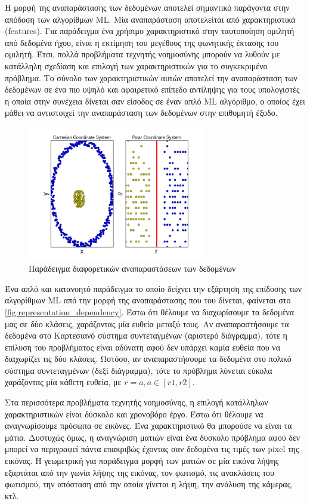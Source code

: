 Η μορφή της αναπαράστασης των δεδομένων αποτελεί σημαντικό παράγοντα στην
απόδοση των αλγορίθμων ML. Μία αναπαράσταση αποτελείται από χαρακτηριστικά (features).
Για παράδειγμα ένα χρήσιμο χαρακτηριστικό στην ταυτοποίηση ομιλητή από δεδομένα ήχου,
είναι η εκτίμηση του μεγέθους της φωνητικής έκτασης του ομιλητή.
Έτσι, πολλά προβλήματα τεχνητής νοημοσύνης μπορούν να λυθούν
με κατάλληλη σχεδίαση και επιλογή των χαρακτηριστικών για το συγκεκριμένο
πρόβλημα. Το σύνολο των χαρακτηριστικών αυτών αποτελεί την αναπαράσταση των δεδομένων
σε ένα πιο υψηλό και αφαιρετικό επίπεδο αντίληψης για τους υπολογιστές η οποία
στην συνέχεια δίνεται σαν είσοδος σε έναν απλό ML αλγόριθμο, ο οποίος έχει
μάθει να αντιστοιχεί την αναπαράσταση των δεδομένων στην επιθυμητή έξοδο.
\begin{figure}[!h]
  \centering
  \includegraphics[width=0.7\textwidth]{./images/chapter3/representation_dependency.png}
  \caption[Παράδειγμα διαφορετικών αναπαραστάσεων των δεδομένων]{Παράδειγμα διαφορετικών αναπαραστάσεων των δεδομένων}
  \label{fig:representation_dependency}
\end{figure}

Ένα απλό και κατανοητό παράδειγμα το οποίο δείχνει την εξάρτηση της επίδοσης των
αλγορίθμων ML από την μορφή της αναπαράστασης που του δίνεται, φαίνεται στο
\autoref{fig:representation_dependency}. Έστω ότι θέλουμε να
διαχωρίσουμε τα δεδομένα μας σε δύο κλάσεις, χαράζοντας μία ευθεία
μεταξύ τους. Αν αναπαραστήσουμε τα δεδομένα στο Καρτεσιανό σύστημα συντεταγμένων (αριστερό διάγραμμα),
τότε η επίλυση του προβλήματος είναι αδύνατη αφού δεν υπάρχει καμία ευθεία
που να διαχωρίζει τις δύο κλάσεις. Ωστόσο, αν αναπαραστήσουμε τα δεδομένα
στο πολικό σύστημα συντεταγμένων (δεξί διάγραμμα), τότε το πρόβλημα λύνεται
εύκολα χαράζοντας μία κάθετη ευθεία, με $r  = a, a \in [r1, r2]$.

Στα περισσότερα προβλήματα τεχνητής νοημοσύνης, η επιλογή κατάλληλων χαρακτηριστικών
είναι δύσκολο και χρονοβόρο έργο. Έστω ότι θέλουμε να αναγνωρίσουμε
πρόσωπα σε εικόνες. Ένα χαρακτηριστικό θα μπορούσε να είναι τα μάτια. Δυστυχώς όμως,
η αναγνώριση ματιών είναι ένα δύσκολο πρόβλημα αφού δεν μπορεί να
περιγραφεί πάντα επακριβώς έχοντας σαν δεδομένα τις τιμές των pixel της εικόνας.
Η γεωμετρική για παράδειγμα μορφή των ματιών σε μία εικόνα λήψης εξαρτάται από την
γωνία λήψης της εικόνας, τον φωτισμό, τις ανακλάσεις του φωτισμού,
την απόσταση από την οποία γίνεται η λήψη, την ανάλυση της κάμερας, κτλ.

